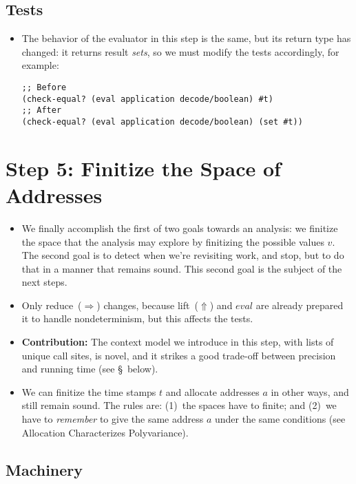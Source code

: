 \documentclass[12pt, oneside]{book}
\begin{document}
\subsection{Tests}

\begin{itemize}
  \item The behavior of the evaluator in this step is the same, but its return type has changed: it returns result \emph{sets}, so we must modify the tests accordingly, for example:
        \begin{Verbatim}
;; Before
(check-equal? (eval application decode/boolean) #t)
;; After
(check-equal? (eval application decode/boolean) (set #t))
        \end{Verbatim}
\end{itemize}

\section{Step 5: Finitize the Space of Addresses}
\label{section:step-5--finitize-the-space-of-addresses}

\begin{itemize}
  \item We finally accomplish the first of two goals towards an analysis: we finitize the space that the analysis may explore by finitizing the possible values \(v\). The second goal is to detect when we’re revisiting work, and stop, but to do that in a manner that remains sound. This second goal is the subject of the next steps.
  \item Only reduce~(\(⇒\)) changes, because lift~(\(⇑\)) and \(eval\) are already prepared it to handle nondeterminism, but this affects the tests.
  \item \textbf{Contribution:} The context model we introduce in this step, with lists of unique call sites, is novel, and it strikes a good trade-off between precision and running time (see §~below).
  \item We can finitize the time stamps \(t\) and allocate addresses \(a\) in other ways, and still remain sound. The rules are: (1)~the spaces have to finite; and (2)~we have to \emph{remember} to give the same address \(a\) under the same conditions (see Allocation Characterizes Polyvariance).
\end{itemize}

\subsection{Machinery}
\end{document}
